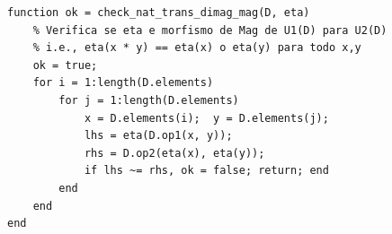 \begin{lstlisting}[style=matlab, caption={Verificação da condição de naturalidade $\eta: U_1 \Rightarrow U_2$}]
function ok = check_nat_trans_dimag_mag(D, eta)
    % Verifica se eta e morfismo de Mag de U1(D) para U2(D)
    % i.e., eta(x * y) == eta(x) o eta(y) para todo x,y
    ok = true;
    for i = 1:length(D.elements)
        for j = 1:length(D.elements)
            x = D.elements(i);  y = D.elements(j);
            lhs = eta(D.op1(x, y));
            rhs = D.op2(eta(x), eta(y));
            if lhs ~= rhs, ok = false; return; end
        end
    end
end
\end{lstlisting}